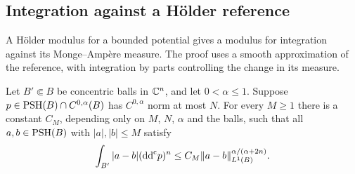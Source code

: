 \subsection{Integration against a H\"older reference}

A H\"older modulus for a bounded potential gives a modulus for integration against its Monge--Amp\`ere measure. The proof uses a smooth approximation of the reference, with integration by parts controlling the change in its measure.

\begin{lemma}\label{lem:local-holder-reference-integrals}
Let $B'\Subset B$ be concentric balls in $\mathbb C^n$, and let $0<\alpha\leq1$. Suppose $p\in\mathrm{PSH}(B)\cap C^{0,\alpha}(B)$ has $C^{0,\alpha}$ norm at most $N$. For every $M\geq1$ there is a constant $C_M$, depending only on $M$, $N$, $\alpha$ and the balls, such that all $a,b\in\mathrm{PSH}(B)$ with $|a|,|b|\leq M$ satisfy
\[
 \int_{B'}|a-b|(\mathrm{dd}^{\mathrm{c}} p)^n
 \leq C_M\|a-b\|_{L^1(B)}^{\alpha/(\alpha+2n)}.
\]
\end{lemma}
